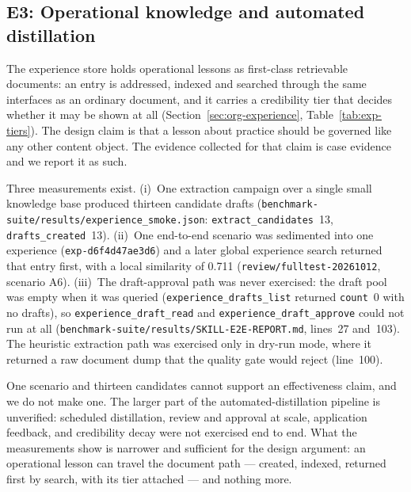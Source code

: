 \subsection{E3: Operational knowledge and automated distillation}
\label{sec:e3}

The experience store holds operational lessons as first-class retrievable
documents: an entry is addressed, indexed and searched through the same
interfaces as an ordinary document, and it carries a credibility tier that
decides whether it may be shown at all
(Section~\ref{sec:org-experience}, Table~\ref{tab:exp-tiers}). The design
claim is that a lesson about practice should be governed like any other
content object. The evidence collected for that claim is case evidence and we
report it as such.

Three measurements exist. (i)~One extraction campaign over a single small
knowledge base produced thirteen candidate drafts
(\texttt{benchmark-suite/results/experience\_smoke.json}:
\texttt{extract\_candidates}~13, \texttt{drafts\_created}~13). (ii)~One
end-to-end scenario was sedimented into one experience
(\texttt{exp-d6f4d47ae3d6}) and a later global experience search returned that
entry first, with a local similarity of 0.711
(\texttt{review/fulltest-20261012}, scenario A6). (iii)~The draft-approval
path was never exercised: the draft pool was empty when it was queried
(\texttt{experience\_drafts\_list} returned \texttt{count}~0 with no drafts),
so \texttt{experience\_draft\_read} and \texttt{experience\_draft\_approve}
could not run at all (\texttt{benchmark-suite/results/SKILL-E2E-REPORT.md},
lines~27 and~103). The heuristic extraction path was exercised only in
dry-run mode, where it returned a raw document dump that the quality gate
would reject (line~100).

One scenario and thirteen candidates cannot support an effectiveness claim,
and we do not make one. The larger part of the automated-distillation
pipeline is unverified: scheduled distillation, review and approval at scale,
application feedback, and credibility decay were not exercised end to end.
What the measurements show is narrower and sufficient for the design
argument: an operational lesson can travel the document path --- created,
indexed, returned first by search, with its tier attached --- and nothing more.


